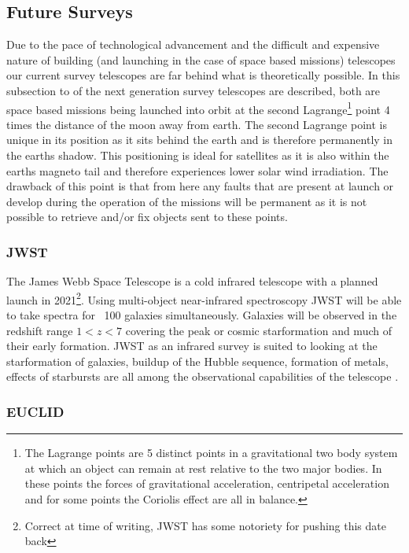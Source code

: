 \subsection{Future Surveys}

Due to the pace of technological advancement and the difficult and expensive nature of building (and launching in the case of space based missions) telescopes our current survey telescopes are far behind what is theoretically possible. In this subsection to of the next generation survey telescopes are described, both are space based missions being launched into orbit at the second Lagrange\footnote{The Lagrange points are 5 distinct points in a gravitational two body system at which an object can remain at rest relative to the two major bodies. In these points the forces of gravitational acceleration, centripetal acceleration and for some points the Coriolis effect are all in balance.} point 4 times the distance of the moon away from earth. The second Lagrange point is unique in its position as it sits behind the earth and is therefore permanently in the earths shadow. This positioning is ideal for satellites as it is also within the earths magneto tail and therefore experiences lower solar wind irradiation. The drawback of this point is that from here any faults that are present at launch or develop during the operation of the missions will be permanent as it is not possible to retrieve and/or fix objects sent to these points.

\subsubsection{JWST \cite{JamesNASA}}

The James Webb Space Telescope is a cold infrared telescope with a planned launch in 2021\footnote{Correct at time of writing, JWST has some notoriety for pushing this date back}. Using multi-object near-infrared spectroscopy JWST will be able to take spectra for ~100 galaxies simultaneously. Galaxies will be observed in the redshift range $1 < z < 7$ covering the peak or cosmic starformation and much of their early formation. JWST as an infrared survey is suited to looking at the starformation of galaxies, buildup of the Hubble sequence, formation of metals, effects of starbursts are all among the observational capabilities of the telescope \cite{Windhorst2009JWST2009}.  


\subsubsection{EUCLID}

